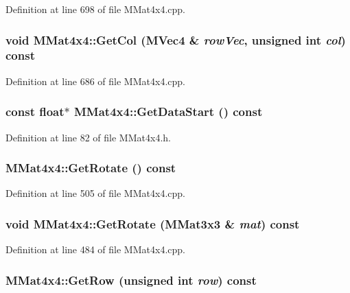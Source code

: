 Definition at line 698 of file MMat4x4.cpp.\hypertarget{class_m_mat4x4_dfeec8261c165fa894048e082702de36}{
\subsubsection[{GetCol}]{\setlength{\rightskip}{0pt plus 5cm}void MMat4x4::GetCol ({\bf MVec4} \& {\em rowVec}, \/  unsigned int {\em col}) const}}
\label{class_m_mat4x4_dfeec8261c165fa894048e082702de36}




Definition at line 686 of file MMat4x4.cpp.\hypertarget{class_m_mat4x4_f024602a5e606751374a11f84a4809ce}{
\subsubsection[{GetDataStart}]{\setlength{\rightskip}{0pt plus 5cm}const float$\ast$ MMat4x4::GetDataStart () const}}
\label{class_m_mat4x4_f024602a5e606751374a11f84a4809ce}




Definition at line 82 of file MMat4x4.h.\hypertarget{class_m_mat4x4_ba9ccf48a89c2d27effd94d16872cc5f}{
\subsubsection[{GetRotate}]{ MMat4x4::GetRotate () const}}
\label{class_m_mat4x4_ba9ccf48a89c2d27effd94d16872cc5f}




Definition at line 505 of file MMat4x4.cpp.\hypertarget{class_m_mat4x4_3cc5b3636f8bd790d477e83ad2396007}{
\subsubsection[{GetRotate}]{\setlength{\rightskip}{0pt plus 5cm}void MMat4x4::GetRotate ({\bf MMat3x3} \& {\em mat}) const}}
\label{class_m_mat4x4_3cc5b3636f8bd790d477e83ad2396007}




Definition at line 484 of file MMat4x4.cpp.\hypertarget{class_m_mat4x4_0cc56b3435aedef6d9477249368d4de9}{
\subsubsection[{GetRow}]{ MMat4x4::GetRow (unsigned int {\em row}) const}}
\label{class_m_mat4x4_0cc56b3435aedef6d9477249368d4de9}





